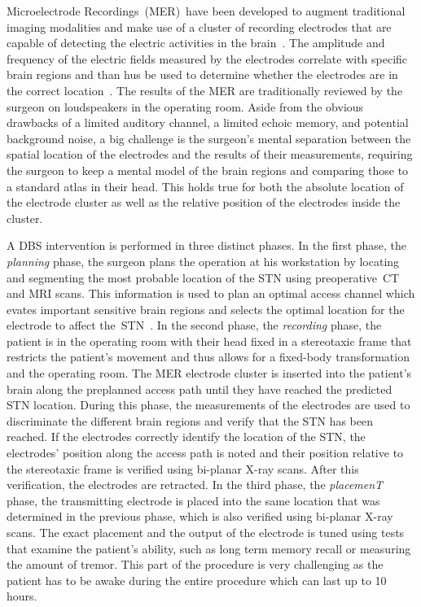 Microelectrode Recordings~(MER)~have been developed to augment traditional imaging modalities and make use of a cluster of recording electrodes that are capable of detecting the electric activities in the brain~\cite{lenz1988methods}.  The amplitude and frequency of the electric fields measured by the electrodes correlate with specific brain regions and than hus be used to determine whether the electrodes are in the correct location~\cite{benazzouz2002intraoperative}.  The results of the MER are traditionally reviewed by the surgeon on loudspeakers in the operating room.  Aside from the obvious drawbacks of a limited auditory channel, a limited echoic memory, and potential background noise, a big challenge is the surgeon's mental separation between the spatial location of the electrodes and the results of their measurements, requiring the surgeon to keep a mental model of the brain regions and comparing those to a standard atlas in their head.  This holds true for both the absolute location of the electrode cluster as well as the relative position of the electrodes inside the cluster.

A DBS intervention is performed in three distinct phases.  In the first phase, the \emph{planning} phase, the surgeon plans the operation at his workstation by locating and segmenting the most probable location of the STN using preoperative~CT and MRI scans.  This information is used to plan an optimal access channel which evates important sensitive brain regions and selects the optimal location for the electrode to affect the~STN~\cite{butson2007patient}.  In the second phase, the \emph{recording} phase, the patient is in the operating room with their head fixed in a stereotaxic frame that restricts the patient's movement and thus allows for a fixed-body transformation and the operating room.  The MER electrode cluster is inserted into the patient's  brain along the preplanned access path until they have reached the predicted STN location.  During this phase, the measurements of the electrodes are used to discriminate the different brain regions and verify that the STN has been reached.  If the electrodes correctly identify the location of the STN, the electrodes' position along the access path is noted and their position relative to the stereotaxic frame is verified using bi-planar X-ray scans.  After this verification, the electrodes are retracted.  In the third phase, the \emph{placemenT} phase, the transmitting electrode is placed into the same location that was determined in the previous phase, which is also verified using bi-planar X-ray scans.  The exact placement and the output of the electrode is tuned using tests that examine the patient's ability, such as long term memory recall or measuring the amount of tremor.  This part of the procedure is very challenging as the patient has to be awake during the entire procedure which can last up to 10 hours.



